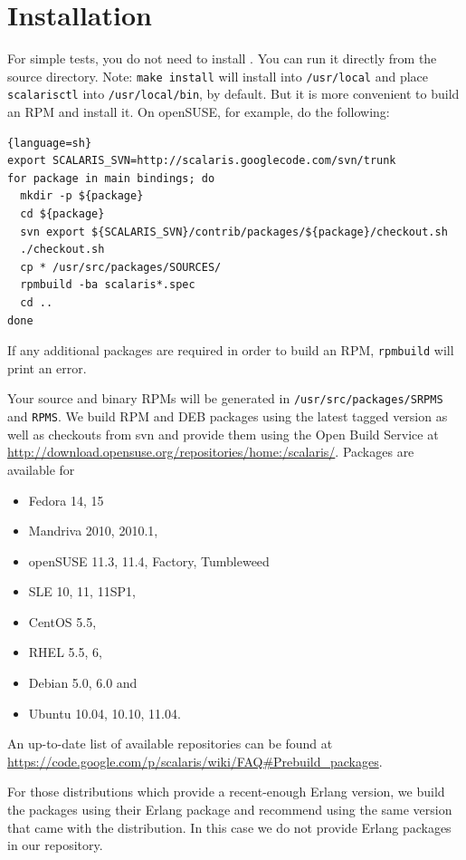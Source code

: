 \documentclass[a4paper]{scrreprt}
\newcommand{\code}[1]{\lstinline[basicstyle=\ttfamily]!#1!}
\begin{document}
\section{Installation}
\label{sec:install}

For simple tests, you do not need to install \scalaris{}. You can run it
directly from the source directory. Note: \code{make install} will install
\scalaris{} into \code{/usr/local} and place \code{scalarisctl} into
\code{/usr/local/bin}, by default. But it is more convenient to build an RPM
and install it.
On openSUSE, for example, do the following:

\begin{lstlisting}{language=sh}
export SCALARIS_SVN=http://scalaris.googlecode.com/svn/trunk
for package in main bindings; do
  mkdir -p ${package}
  cd ${package}
  svn export ${SCALARIS_SVN}/contrib/packages/${package}/checkout.sh
  ./checkout.sh
  cp * /usr/src/packages/SOURCES/
  rpmbuild -ba scalaris*.spec
  cd ..
done
\end{lstlisting}

If any additional packages are required in order to build an RPM,
\code{rpmbuild} will print an error.

Your source and binary RPMs will be generated in
\code{/usr/src/packages/SRPMS} and \code{RPMS}. We build RPM and DEB packages
using the latest tagged version as well as checkouts from svn and provide them
using the Open Build Service at
\url{http://download.opensuse.org/repositories/home:/scalaris/}. Packages
are available for

\begin{itemize}
\item Fedora 14, 15
\item Mandriva 2010, 2010.1,
\item openSUSE 11.3, 11.4, Factory, Tumbleweed
\item SLE 10, 11, 11SP1,
\item CentOS 5.5,
\item RHEL 5.5, 6,
\item Debian 5.0, 6.0 and
\item Ubuntu 10.04, 10.10, 11.04.
\end{itemize}

An up-to-date list of available repositories can be found at
\url{https://code.google.com/p/scalaris/wiki/FAQ#Prebuild_packages}.

For those distributions which provide a recent-enough Erlang version, we build
the packages using their Erlang package and recommend using the same version
that came with the distribution. In this case we do not provide Erlang packages
in our repository.
\end{document}
